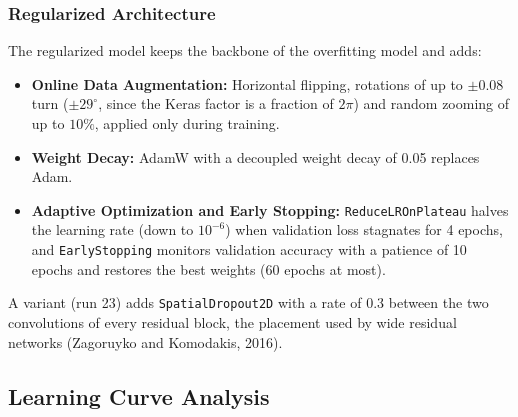 \documentclass[11pt, a4paper]{article}
\begin{document}
\subsubsection{Regularized Architecture}
The regularized model keeps the backbone of the overfitting model and adds:
\begin{itemize}
    \item \textbf{Online Data Augmentation:} Horizontal flipping, rotations of up to $\pm 0.08$ turn ($\pm 29^\circ$, since the Keras factor is a fraction of $2\pi$) and random zooming of up to $10\%$, applied only during training.
    \item \textbf{Weight Decay:} AdamW with a decoupled weight decay of 0.05 replaces Adam.
    \item \textbf{Adaptive Optimization and Early Stopping:} \texttt{ReduceLROnPlateau} halves the learning rate (down to $10^{-6}$) when validation loss stagnates for 4 epochs, and \texttt{EarlyStopping} monitors validation accuracy with a patience of 10 epochs and restores the best weights (60 epochs at most).
\end{itemize}
A variant (run 23) adds \texttt{SpatialDropout2D} with a rate of 0.3 between the two convolutions of every residual block, the placement used by wide residual networks (Zagoruyko and Komodakis, 2016).

\subsection{Learning Curve Analysis}
\end{document}
